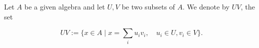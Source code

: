 Let $A$ be a given algebra and let $U, V$ be two subsets of $A$. We denote by $UV$, the set

$$UV := \{x \in A \mid x = \sum_i u_i v_i, \quad u_i \in U, v_i \in V\}.$$
